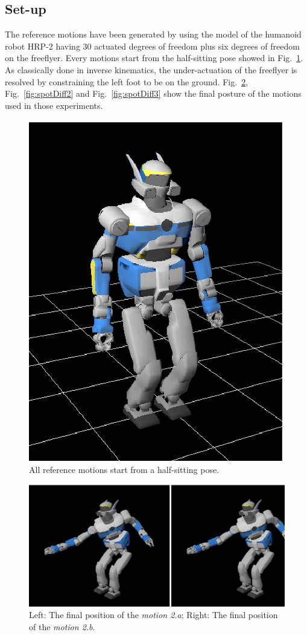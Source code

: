 \documentclass[letterpaper, 10pt, conference]{ieeeconf}      %
\begin{document}
\subsection{Set-up}
The reference motions have been generated by using the model of the humanoid robot HRP-2 
having 30 actuated degrees of freedom plus six degrees of freedom on the
freeflyer. Every motions start from the half-sitting pose showed in Fig.~\ref{fig:halfSit}.
As classically done in inverse kinematics, the under-actuation of the freeflyer is resolved by constraining
the left foot to be on the ground. 
Fig.~\ref{fig:spotDiff1},
Fig.~\ref{fig:spotDiff2} and Fig.~\ref{fig:spotDiff3} show the final posture of the motions used in those
experiments.
\begin{figure}[t]
\begin{center}
\includegraphics[width=0.3\linewidth]{img/halfSit.ps}
\end{center}
\caption{All reference motions start from a half-sitting pose.}
\label{fig:halfSit}
\end{figure}
\begin{figure}[t]
  \begin{center}
    \includegraphics[width=0.9\linewidth]{img/spotDiff.ps}
  \end{center}
  \caption{Left: The final position of the \emph{motion 2.a}; Right: The final position of the \emph{motion 2.b}.}
  \label{fig:spotDiff1}
\end{figure}
\end{document}
